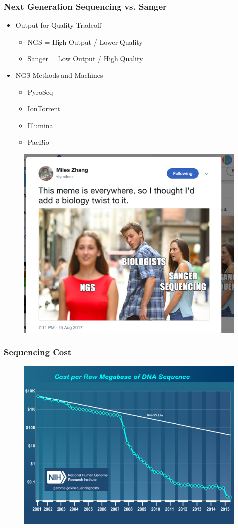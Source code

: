\documentclass{beamer}
\begin{document}
\begin{frame}
\frametitle{Next Generation Sequencing vs. Sanger}
\begin{itemize}
	\item<1-> Output for Quality Tradeoff
	\begin{itemize}
		\item NGS = High Output / Lower Quality
		\item Sanger = Low Output / High Quality
	\end{itemize}
	\item<2-> NGS Methods and Machines
	\begin{itemize}
		\item<3-> PyroSeq
		\item IonTorrent
		\item Illumina
		\item PacBio
	\end{itemize}
\end{itemize}
\end{frame}
\begin{frame}
\begin{figure}
\includegraphics[width=0.8\linewidth]{images_20170829_NGS_meme.png}
\end{figure}
\end{frame}
\begin{frame}
\frametitle{Sequencing Cost}
\begin{figure}
\includegraphics[width=0.8\linewidth]{images_20170829_NGS_cost.jpg}
\end{figure}
\end{frame}
\end{document}
